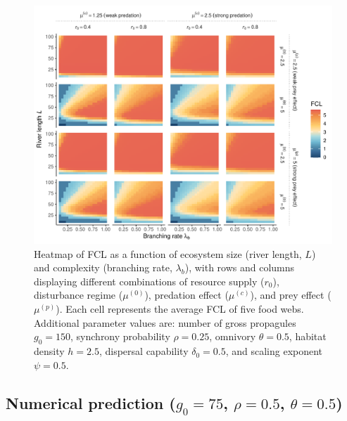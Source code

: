 \begin{figure}
\centering
\includegraphics{../data_fmt/fig_rho025_g150_theta05.pdf}
\caption{Heatmap of FCL as a function of ecosystem size (river length,
\(L\)) and complexity (branching rate, \(\lambda_b\)), with rows and
columns displaying different combinations of resource supply (\(r_0\)),
disturbance regime (\(\mu^{(0)}\)), predation effect (\(\mu^{(c)}\)),
and prey effect (\(\mu^{(p)}\)). Each cell represents the average FCL of
five food webs. Additional parameter values are: number of gross
propagules \(g_0=150\), synchrony probability \(\rho=0.25\), omnivory
\(\theta=0.5\), habitat density \(h=2.5\), dispersal capability
\(\delta_0=0.5\), and scaling exponent \(\psi=0.5\).}
\end{figure}

\newpage

\subsection{\texorpdfstring{Numerical prediction (\(g_0=75\),
\(\rho=0.5\),
\(\theta=0.5\))}{Numerical prediction (g\_0=75, \textbackslash rho=0.5, \textbackslash theta=0.5)}}\label{numerical-prediction-g_075-rho0.5-theta0.5}

